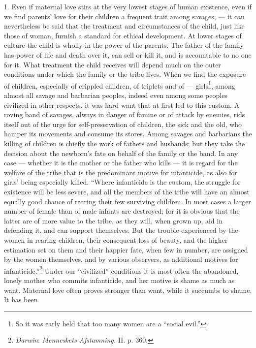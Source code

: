 \documentclass[12pt,a4paper,openany]{book}
\newcommand{\opage}[1]{\marginnote{\footnotesize\textit{[#1]}}}
\begin{document}
1. Even if maternal love stirs at the very lowest stages of human existence, even if we find parents' love for their
children a frequent trait among savages, --- it can nevertheless be said that the treatment and circumstances of the
child, just like those of woman, furnish a standard for ethical development. At lower stages of culture the child is
wholly in the power of the parents. The father of the family has power of life and death over it, can sell or kill it,
and is accountable to no one for it. What treatment the child receives will depend much on the outer conditions under
which the family or the tribe lives. When we find the exposure of children, especially of crippled children, of triplets
and of --- girls\footnote[1]{So it was early held that too many women are a ``social evil.''}, among almost all savage
and barbarian peoples, indeed even among some peoples civilized in other respects, it was hard want that at first led to
this custom. A roving band of savages, always in danger of famine or of attack by enemies, rids itself out of the urge
for self-preservation of children, the sick and the old, who hamper its movements and consume its stores. Among savages
and barbarians the killing of children is chiefly the work of fathers and husbands; but they take the decision about
the newborn's fate on behalf of the family or the band. In any case --- whether it is the mother or the father who kills
--- it is regard for the welfare of the tribe that is the predominant motive for infanticide, as also for girls' being
especially killed. ``Where infanticide is the custom, the struggle for existence will be less severe, and all the members
of the tribe will have an almost equally good chance of rearing their few surviving children. In most cases a larger
number of
\opage{327}female than of male infants are destroyed; for it is obvious that the latter are of more value to the tribe,
as they will, when grown up, aid in defending it, and can support themselves. But the trouble experienced by the women
in rearing children, their consequent loss of beauty, and the higher estimation set on them and their happier fate, when
few in number, are assigned by the women themselves, and by various observers, as additional motives for
infanticide.''\footnote[1]{\emph{Darwin}: \textit{Menneskets Afstamning.} II. p. 360.}%
Under our ``civilized'' conditions it is most often the abandoned, lonely mother who commits infanticide, and her
motive is shame as much as want. Maternal love often proves stronger than want, while it succumbs to shame. It has been
\end{document}
